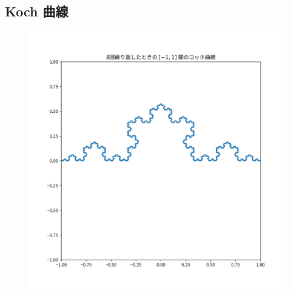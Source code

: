 \subsection{Koch 曲線}
\begin{figure}[htbp]
  \centering
  \includegraphics[keepaspectratio, scale=0.8]{images/OtherProblem/ctest5_3.png}
\end{figure}

